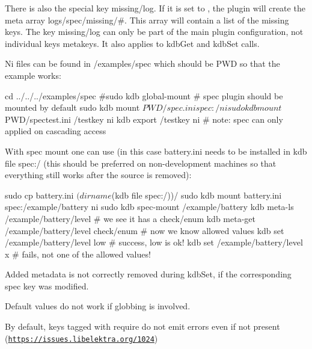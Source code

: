 There is also the special key {\ttfamily missing/log}. If it is set to {}, the plugin will create the meta array {\ttfamily logs/spec/missing/\#}. This array will contain a list of the missing keys. The key {\ttfamily missing/log} can only be part of the main plugin configuration, not individual keys\textquotesingle{} metakeys. It also applies to {\ttfamily kdb\+Get} and {\ttfamily kdb\+Set} calls.

Ni files can be found in /examples/spec which should be P\+WD so that the example works\+:


\begin{DoxyCode}
cd ../../../examples/spec
#sudo kdb global-mount        # spec plugin should be mounted by default
sudo kdb mount $PWD/spec.ini spec:/ ni
sudo kdb mount $PWD/spectest.ini /testkey ni
kdb export /testkey ni     # note: spec can only applied on cascading access
\end{DoxyCode}


With spec mount one can use (in this case battery.\+ini needs to be installed in {\ttfamily kdb file spec\+:/} (this should be preferred on non-\/development machines so that everything still works after the source is removed)\+:


\begin{DoxyCode}
sudo cp battery.ini $(dirname $(kdb file spec:/))/
sudo kdb mount battery.ini spec:/example/battery ni
sudo kdb spec-mount /example/battery
kdb meta-ls /example/battery/level    # we see it has a check/enum
kdb meta-get /example/battery/level check/enum    # now we know allowed values
kdb set /example/battery/level low   # success, low is ok!
kdb set /example/battery/level x     # fails, not one of the allowed values!
\end{DoxyCode}






\begin{DoxyItemize}
\item Added metadata is not correctly removed during {\ttfamily kdb\+Set}, if the corresponding spec key was modified.
\item Default values do not work if globbing is involved.
\item By default, keys tagged with {\ttfamily require} do not emit errors even if not present (\href{https://issues.libelektra.org/1024}{\tt https\+://issues.\+libelektra.\+org/1024}) 
\end{DoxyItemize}